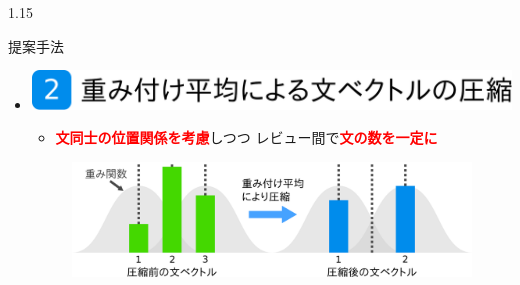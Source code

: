\documentclass[unicode,10pt]{beamer}
\newlength{\mycolumnwidth}
\newlength{\mytitlefigureheight}
\newcommand{\itemtitle}[1]{\textbf{#1}\\}
\newcommand{\fire}[1]{\textcolor{red}{\textbf{#1}}}
\newcommand{\doublecolumns}[4]{
    \begin{minipage}[t]{#1}
      #2
    \end{minipage}
    \begin{minipage}[t]{#3}
      #4
    \end{minipage}}
\begin{document}
\begin{frame}[t]
\begin{columns}[onlytextwidth,t]
\begin{column}{1.15\mycolumnwidth}
\begin{block}{提案手法}
    \begin{itemize}
      \item \itemtitle{\includegraphics[height=\mytitlefigureheight]
                                       {fig/poster_model_title_2.pdf}}
        \begin{itemize}
          \item \fire{文同士の位置関係を考慮}しつつ
                レビュー間で\fire{文の数を一定に}
        \end{itemize}
        \begin{figure}
          \includegraphics[width=\linewidth]
                          {fig/what_are_you_weighting_for.pdf}
        \end{figure}

\end{itemize}
\end{block}
\end{column}
\end{columns}
\end{frame}
\end{document}
